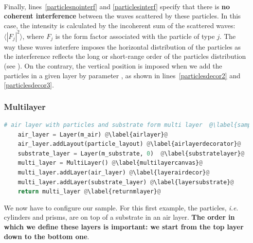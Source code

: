 \\


\noindent Finally, lines~\ref{particlesnointerf} and
\ref{particlesinterf} specify that there is \textbf{no coherent interference} between
the waves scattered by these particles. In this case, the intensity is calculated by
the incoherent sum of the scattered waves: $\langle |F_j|^2\rangle$,
where $F_j$ is the form factor associated with the particle of type $j$.  The way these waves
interfere imposes the horizontal distribution of
the particles as
the interference reflects the long or short-range order of the
particles distribution (see  ). On the contrary, the vertical position is
imposed when we add the particles in a given layer by parameter , as shown in lines~\ref{particlesdecor2} and \ref{particlesdecor3}.

\subsubsection{Multilayer}
\begin{lstlisting}[language=python, style=eclipseboxed,name=ex1,nolol]
# air layer with particles and substrate form multi layer  @\label{sampleassembling}@
    air_layer = Layer(m_air) @\label{airlayer}@
    air_layer.addLayout(particle_layout) @\label{airlayerdecorator}@
    substrate_layer = Layer(m_substrate, 0)  @\label{substratelayer}@
    multi_layer = MultiLayer() @\label{multilayercanvas}@
    multi_layer.addLayer(air_layer) @\label{layerairdecor}@
    multi_layer.addLayer(substrate_layer) @\label{layersubstrate}@
    return multi_layer @\label{returnmlayer}@
\end{lstlisting}
We now have to configure our sample. For this first example,
the particles, \textit{i.e.} cylinders and prisms, are on top of a substrate in an
air layer. \textbf{The order in which we define these layers is important: we
start from the top layer down to the bottom one}.

